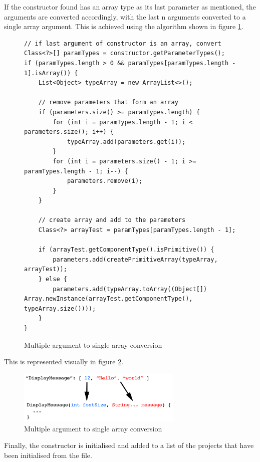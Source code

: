 If the constructor found has an array type as its last parameter as mentioned, the arguments  are converted accordingly, with the last n arguments converted to a single array argument. This is achieved using the algorithm shown in figure  \ref{fig:arguments_to_array}.
\begin{figure}
\centering
\caption{Multiple argument to single array conversion}
\label{fig:arguments_to_array}
\begin{verbatim}
// if last argument of constructor is an array, convert
Class<?>[] paramTypes = constructor.getParameterTypes();
if (paramTypes.length > 0 && paramTypes[paramTypes.length - 1].isArray()) {
    List<Object> typeArray = new ArrayList<>();

    // remove parameters that form an array
    if (parameters.size() >= paramTypes.length) {
        for (int i = paramTypes.length - 1; i < parameters.size(); i++) {
            typeArray.add(parameters.get(i));
        }
        for (int i = parameters.size() - 1; i >= paramTypes.length - 1; i--) {
            parameters.remove(i);
        }
    }

    // create array and add to the parameters
    Class<?> arrayTest = paramTypes[paramTypes.length - 1];

    if (arrayTest.getComponentType().isPrimitive()) {
        parameters.add(createPrimitiveArray(typeArray, arrayTest));
    } else {
        parameters.add(typeArray.toArray((Object[]) 
Array.newInstance(arrayTest.getComponentType(), typeArray.size())));
    }
}
\end{verbatim}
\end{figure}

This is represented visually in figure  \ref{fig:arguments_to_array_visual}.

\begin{figure}
\centering
\caption{Multiple argument to single array conversion}
\label{fig:arguments_to_array_visual}
\includegraphics[width=0.7\textwidth]{Figures/array.png}
\end{figure}

Finally, the constructor is initialised and added to a list of the projects that have been initialised from the file.\par

